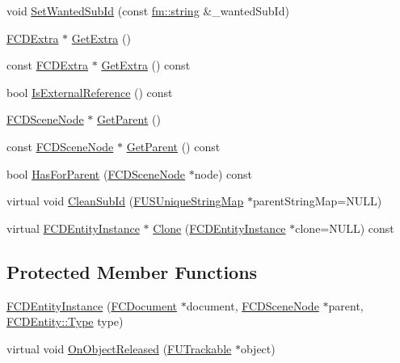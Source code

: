 \begin{DoxyCompactItemize}
\item 
void \hyperlink{classFCDEntityInstance_a4fb6a523d628e1046ebea5d9708453f2}{SetWantedSubId} (const \hyperlink{classfm_1_1stringT}{fm::string} \&\_\-wantedSubId)
\item 
\hyperlink{classFCDExtra}{FCDExtra} $\ast$ \hyperlink{classFCDEntityInstance_af0318e0e117788b3b26b77c1bb91eaac}{GetExtra} ()
\item 
const \hyperlink{classFCDExtra}{FCDExtra} $\ast$ \hyperlink{classFCDEntityInstance_ada20db4b24a8be692cf53844ebb08512}{GetExtra} () const 
\item 
bool \hyperlink{classFCDEntityInstance_a429583fbf800628e8d4f8075c593f7ac}{IsExternalReference} () const 
\item 
\hyperlink{classFCDSceneNode}{FCDSceneNode} $\ast$ \hyperlink{classFCDEntityInstance_a3b384a12ff92c1ac984a1772e562d87a}{GetParent} ()
\item 
const \hyperlink{classFCDSceneNode}{FCDSceneNode} $\ast$ \hyperlink{classFCDEntityInstance_acb1d825d422ab6484db2b5e862b18bfa}{GetParent} () const 
\item 
bool \hyperlink{classFCDEntityInstance_a61c83c6bc229353ea1c00bbae91df674}{HasForParent} (\hyperlink{classFCDSceneNode}{FCDSceneNode} $\ast$node) const 
\item 
virtual void \hyperlink{classFCDEntityInstance_a06ed77f5adc21e43eb2617db6af5df6c}{CleanSubId} (\hyperlink{classFUUniqueStringMapT}{FUSUniqueStringMap} $\ast$parentStringMap=NULL)
\item 
virtual \hyperlink{classFCDEntityInstance}{FCDEntityInstance} $\ast$ \hyperlink{classFCDEntityInstance_a64b11d12fcf0151800084f66bbbeb2d6}{Clone} (\hyperlink{classFCDEntityInstance}{FCDEntityInstance} $\ast$clone=NULL) const 
\end{DoxyCompactItemize}
\subsection*{Protected Member Functions}
\begin{DoxyCompactItemize}
\item 
\hyperlink{classFCDEntityInstance_a0595d4840743b79b7fe535f250d3a9bf}{FCDEntityInstance} (\hyperlink{classFCDocument}{FCDocument} $\ast$document, \hyperlink{classFCDSceneNode}{FCDSceneNode} $\ast$parent, \hyperlink{classFCDEntity_a9301a4bd5f4d4190ec13e40db4effdd7}{FCDEntity::Type} type)
\item 
virtual void \hyperlink{classFCDEntityInstance_ae66647da209d1030a2e4a36ac3bd7d63}{OnObjectReleased} (\hyperlink{classFUTrackable}{FUTrackable} $\ast$object)
\end{DoxyCompactItemize}
